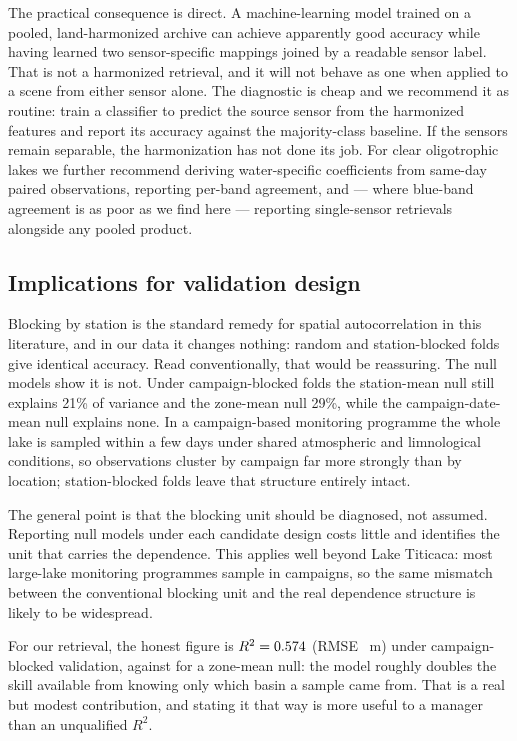 \documentclass[final,5p,times,twocolumn,authoryear]{elsarticle}
\begin{document}
The practical consequence is direct. A machine-learning model trained on a
pooled, land-harmonized archive can achieve apparently good accuracy while
having learned two sensor-specific mappings joined by a readable sensor
label. That is not a harmonized retrieval, and it will not behave as one when
applied to a scene from either sensor alone. The diagnostic is cheap and we
recommend it as routine: train a classifier to predict the source sensor from
the harmonized features and report its accuracy against the majority-class
baseline. If the sensors remain separable, the harmonization has not done its
job. For clear oligotrophic lakes we further recommend deriving
water-specific coefficients from same-day paired observations, reporting
per-band agreement, and --- where blue-band agreement is as poor as we find
here --- reporting single-sensor retrievals alongside any pooled product.

\subsection{Implications for validation design}

Blocking by station is the standard remedy for spatial autocorrelation in
this literature, and in our data it changes nothing: random and
station-blocked folds give identical accuracy. Read conventionally, that
would be reassuring. The null models show it is not. Under campaign-blocked
folds the station-mean null still explains 21\% of variance and the zone-mean
null 29\%, while the campaign-date-mean null explains none. In a
campaign-based monitoring programme the whole lake is sampled within a few
days under shared atmospheric and limnological conditions, so observations
cluster by campaign far more strongly than by location; station-blocked folds
leave that structure entirely intact.

The general point is that the blocking unit should be diagnosed, not assumed.
Reporting null models under each candidate design costs little and identifies
the unit that carries the dependence. This applies well beyond Lake Titicaca:
most large-lake monitoring programmes sample in campaigns, so the same
mismatch between the conventional blocking unit and the real dependence
structure is likely to be widespread.

For our retrieval, the honest figure is $R^2=0.574{}$ (RMSE
\numHeadlineRmse~m) under campaign-blocked validation, against
\numNullZonaRTwo{} for a zone-mean null: the model roughly doubles the skill
available from knowing only which basin a sample came from. That is a real
but modest contribution, and stating it that way is more useful to a manager
than an unqualified $R^2$.
\end{document}
